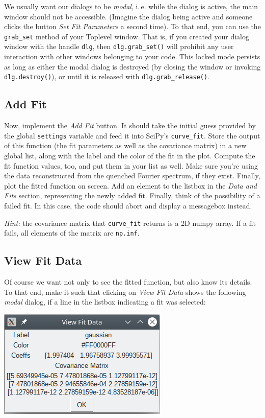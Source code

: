 \documentclass[
	english,
	fontsize=10pt,
	parskip=half,
	titlepage=true,
	DIV=12
]{scrartcl}
\newcommand*{\inPy}[1]{\texttt{#1}}
\newcommand*{\ie}{i.\,e.\xspace}
\begin{document}
We usually want our dialogs to be \emph{modal}, \ie while the dialog is active, the main window should not be accessible. (Imagine the dialog being active and someone clicks the button \emph{Set Fit Parameters} a second time). To that end, you can use the \texttt{grab\_set} method of your Toplevel window. That is, if you created your dialog window with the handle \texttt{dlg}, then \inPy{dlg.grab_set()} will prohibit any user interaction with other windows belonging to your code. This locked mode persists as long as either the modal dialog is destroyed (by closing the window or invoking \texttt{dlg.destroy()}), or until it is released with \inPy{dlg.grab_release()}.

\subsection{Add Fit}
Now, implement the \emph{Add Fit} button. It should take the initial guess provided by the global \texttt{settings} variable and feed it into SciPy's \texttt{curve\_fit}. Store the output of this function (the fit parameters as well as the covariance matrix) in a new global list, along with the label and the color of the fit in the plot. Compute the fit function values, too, and put them in your list as well. Make sure you're using the data reconstructed from the quenched Fourier spectrum, if they exist. Finally, plot the fitted function on screen. Add an element to the listbox in the \emph{Data and Fits} section, representing the newly added fit. Finally, think of the possibility of a failed fit. In this case, the code should abort and display a messagebox instead.

\emph{Hint:} the covariance matrix that \texttt{curve\_fit} returns is a 2D numpy array. If a fit fails, all elements of the matrix are \texttt{np.inf}.

\subsection{View Fit Data}
Of course we want not only to see the fitted function, but also know its details. To that end, make it such that clicking on \emph{View Fit Data} shows the following \emph{modal} dialog, if a line in the listbox indicating a fit was selected:
\begin{center}
	\includegraphics[width=.4\linewidth]{./tk-ViewFitData}
\end{center}
\end{document}

